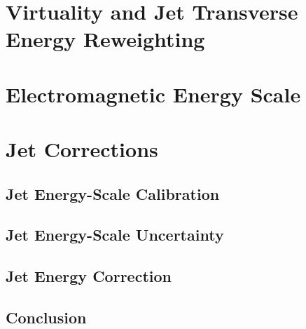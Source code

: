 \section{Virtuality and Jet Transverse Energy Reweighting}
\label{sec:q2etrew}

\newpage
\section{Electromagnetic Energy Scale}
\label{sec:eleenescale}


 \section{Jet Corrections}
 \subsection{Jet Energy-Scale Calibration}
 
  \subsection{Jet Energy-Scale Uncertainty}
  
 \subsection{Jet Energy Correction}
 
 \subsection{Conclusion}
  